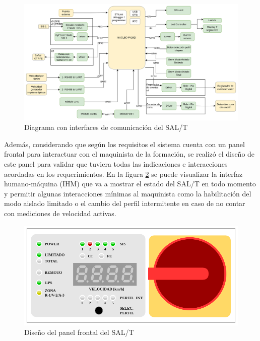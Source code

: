 \begin{figure}[H]
    \centering
    \includegraphics[width =  \linewidth]{img/diagrama_con_coms.png}
    \caption{Diagrama con interfaces de comunicación del SAL/T}
    \label{fig:diagrama_bloques_coms}
\end{figure}


Además, considerando que según los requisitos el sistema cuenta con un panel frontal para interactuar con el maquinista de la formación, se realizó el diseño de este panel para validar que tuviera todas las indicaciones e interacciones acordadas en los requerimientos. En la figura \ref{fig:panel_frontal} se puede visualizar la interfaz humano-máquina (IHM) que va a mostrar el estado del SAL/T en todo momento y permitir algunas interacciones mínimas al maquinista como la habilitación del modo aislado limitado o el cambio del perfil intermitente en caso de no contar con mediciones de velocidad activas. 
 
\begin{figure}[H]
    \centering
    \includegraphics[width =  \linewidth]{img/ihm.png}
    \caption{Diseño del panel frontal del SAL/T}
    \label{fig:panel_frontal}
\end{figure}

